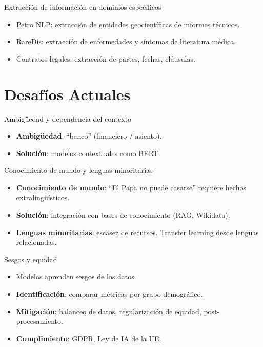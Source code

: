 \documentclass[aspectratio=169, 10pt, xcolor=table]{beamer}
\begin{document}
\begin{frame}{Extracción de información en dominios específicos}
    \begin{itemize}
        \item Petro NLP: extracción de entidades geocientíficas de informes técnicos.
        \item RareDis: extracción de enfermedades y síntomas de literatura médica.
        \item Contratos legales: extracción de partes, fechas, cláusulas.
    \end{itemize}
\end{frame}

\section{Desafíos Actuales}

\begin{frame}{Ambigüedad y dependencia del contexto}
    \begin{itemize}
        \item \textbf{Ambigüedad}: ``banco'' (financiero / asiento).
        \item \textbf{Solución}: modelos contextuales como BERT.
    \end{itemize}
\end{frame}

\begin{frame}{Conocimiento de mundo y lenguas minoritarias}
    \begin{itemize}
        \item \textbf{Conocimiento de mundo}: ``El Papa no puede casarse'' requiere hechos extralingüísticos.
        \item \textbf{Solución}: integración con bases de conocimiento (RAG, Wikidata).
        \item \textbf{Lenguas minoritarias}: escasez de recursos. Transfer learning desde lenguas relacionadas.
    \end{itemize}
\end{frame}

\begin{frame}{Sesgos y equidad}
    \begin{itemize}
        \item Modelos aprenden sesgos de los datos.
        \item \textbf{Identificación}: comparar métricas por grupo demográfico.
        \item \textbf{Mitigación}: balanceo de datos, regularización de equidad, post-procesamiento.
        \item \textbf{Cumplimiento}: GDPR, Ley de IA de la UE.
    \end{itemize}
\end{frame}
\end{document}
